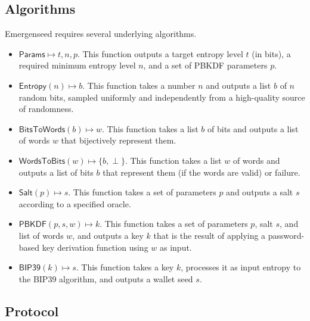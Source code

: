 \documentclass{article}
\begin{document}
\subsection{Algorithms}

Emergenseed requires several underlying algorithms.

\begin{itemize}
	\item $\mathsf{Params} \mapsto t, n, p$. This function outputs a target entropy level $t$ (in bits), a required minimum entropy level $n$, and a set of PBKDF parameters $p$.
	\item $\mathsf{Entropy}(n) \mapsto b$. This function takes a number $n$ and outputs a list $b$ of $n$ random bits, sampled uniformly and independently from a high-quality source of randomness.
	\item $\mathsf{BitsToWords}(b) \mapsto w$. This function takes a list $b$ of bits and outputs a list of words $w$ that bijectively represent them.
	\item $\mathsf{WordsToBits}(w) \mapsto \{b, \perp\}$. This function takes a list $w$ of words and outputs a list of bits $b$ that represent them (if the words are valid) or failure.
	\item $\mathsf{Salt}(p) \mapsto s$. This function takes a set of parameters $p$ and outputs a salt $s$ according to a specified oracle.
	\item $\mathsf{PBKDF}(p, s, w) \mapsto k$. This function takes a set of parameters $p$, salt $s$, and list of words $w$, and outputs a key $k$ that is the result of applying a password-based key derivation function using $w$ as input.
	\item $\mathsf{BIP39}(k) \mapsto s$. This function takes a key $k$, processes it as input entropy to the BIP39 algorithm, and outputs a wallet seed $s$.
\end{itemize}


\subsection{Protocol}
\end{document}
